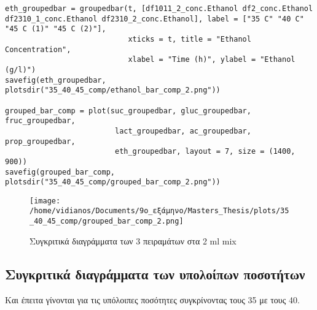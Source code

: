 \documentclass[11pt]{article}
\begin{document}
\begin{verbatim}
eth_groupedbar = groupedbar(t, [df1011_2_conc.Ethanol df2_conc.Ethanol df2310_1_conc.Ethanol df2310_2_conc.Ethanol], label = ["35 C" "40 C" "45 C (1)" "45 C (2)"],
                            xticks = t, title = "Ethanol Concentration",
                            xlabel = "Time (h)", ylabel = "Ethanol (g/l)")
savefig(eth_groupedbar, plotsdir("35_40_45_comp/ethanol_bar_comp_2.png"))

grouped_bar_comp = plot(suc_groupedbar, gluc_groupedbar, fruc_groupedbar,
                         lact_groupedbar, ac_groupedbar, prop_groupedbar,
                         eth_groupedbar, layout = 7, size = (1400, 900))
savefig(grouped_bar_comp, plotsdir("35_40_45_comp/grouped_bar_comp_2.png"))

\end{verbatim}

\begin{figure}[htbp]
\centering
\texttt{[image: /home/vidianos/Documents/9o\_εξάμηνο/Masters\_Thesis/plots/35\_40\_45\_comp/grouped\_bar\_comp\_2.png]}
\caption{Συγκριτικά διαγράμματα των 3 πειραμάτων στα 2 ml mix}
\end{figure}

\subsection{Συγκριτικά διαγράμματα των υπολοίπων ποσοτήτων}
\label{sec:orgb0797a7}
Και έπειτα γίνονται για τις υπόλοιπες ποσότητες συγκρίνοντας τους 35 με τους 40.
\end{document}
